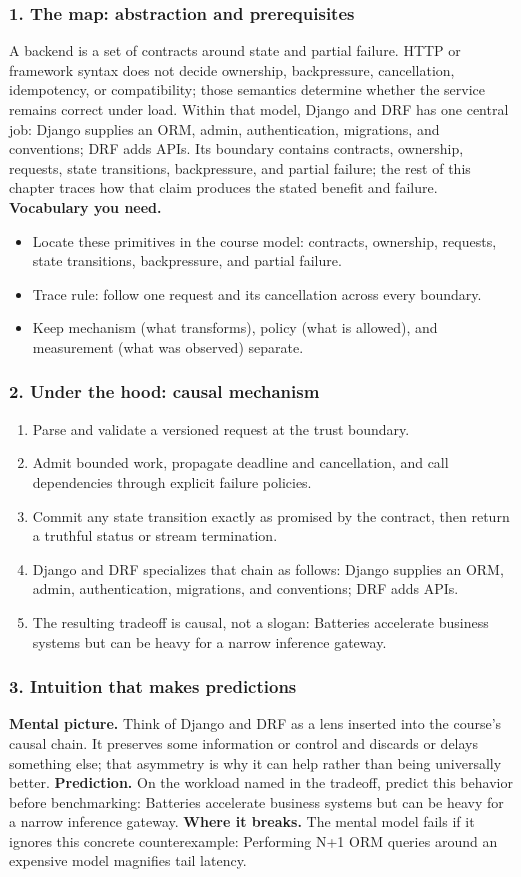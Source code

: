 \subsubsection*{1. The map: abstraction and prerequisites}
A backend is a set of contracts around state and partial failure. HTTP or framework syntax does not decide ownership, backpressure, cancellation, idempotency, or compatibility; those semantics determine whether the service remains correct under load.
Within that model, Django and DRF has one central job: Django supplies an ORM, admin, authentication, migrations, and conventions; DRF adds APIs. Its boundary contains contracts, ownership, requests, state transitions, backpressure, and partial failure; the rest of this chapter traces how that claim produces the stated benefit and failure.
\textbf{Vocabulary you need.}\begin{itemize}
\item Locate these primitives in the course model: contracts, ownership, requests, state transitions, backpressure, and partial failure.
\item Trace rule: follow one request and its cancellation across every boundary.
\item Keep mechanism (what transforms), policy (what is allowed), and measurement (what was observed) separate.
\end{itemize}
\subsubsection*{2. Under the hood: causal mechanism}\begin{enumerate}
\item Parse and validate a versioned request at the trust boundary.
\item Admit bounded work, propagate deadline and cancellation, and call dependencies through explicit failure policies.
\item Commit any state transition exactly as promised by the contract, then return a truthful status or stream termination.
\item Django and DRF specializes that chain as follows: Django supplies an ORM, admin, authentication, migrations, and conventions; DRF adds APIs.
\item The resulting tradeoff is causal, not a slogan: Batteries accelerate business systems but can be heavy for a narrow inference gateway.
\end{enumerate}
\subsubsection*{3. Intuition that makes predictions}
\textbf{Mental picture.} Think of Django and DRF as a lens inserted into the course's causal chain. It preserves some information or control and discards or delays something else; that asymmetry is why it can help rather than being universally better.
\textbf{Prediction.} On the workload named in the tradeoff, predict this behavior before benchmarking: Batteries accelerate business systems but can be heavy for a narrow inference gateway.
\textbf{Where it breaks.} The mental model fails if it ignores this concrete counterexample: Performing N+1 ORM queries around an expensive model magnifies tail latency.

